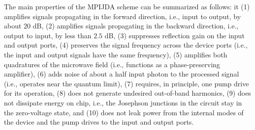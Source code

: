 \documentclass[aip,onecolumn,10pt]{revtex4}%
\begin{document}
The main properties of the MPIJDA scheme can be summarized as follows: it (1) amplifies signals propagating in the forward direction, i.e., input to output, by about $20$ dB, (2) amplifies signals propagating in the backward direction, i.e., output to input, by less than $2.5$ dB, (3) suppresses reflection gain on the input and output ports, (4) preserves the signal frequency across the device ports (i.e., the input and output signals have the same frequency), (5) amplifies both quadratures of the microwave field (i.e., functions as a phase-preserving amplifier), (6) adds noise of about a half input photon to the processed signal (i.e., operates near the quantum limit), (7) requires, in principle, one pump drive for its operation, (8) does not generate undesired out-of-band harmonics, (9) does not dissipate energy on chip, i.e., the Josephson junctions in the circuit stay in the zero-voltage state, and (10) does not leak power from the internal modes of the device and the pump drives to the input and output ports.
\end{document}
